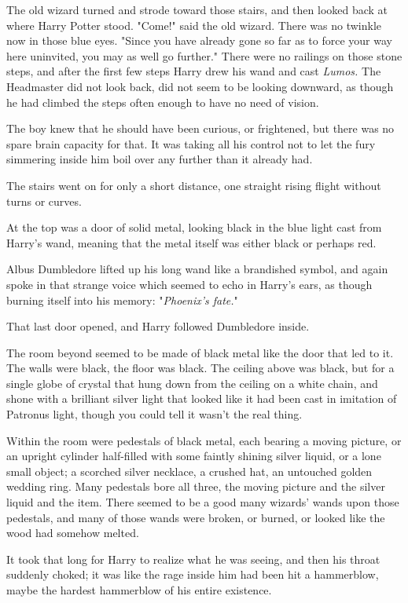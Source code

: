 The old wizard turned and strode toward those stairs, and then looked back at 
where Harry Potter stood. "Come!" said the old wizard. There was no twinkle now 
in those blue eyes. "Since you have already gone so far as to force your way 
here uninvited, you may as well go further."
\sbreak
There were no railings on those stone steps, and after the first few steps 
Harry drew his wand and cast \emph{Lumos.} The Headmaster did not look back, 
did not seem to be looking downward, as though he had climbed the steps often 
enough to have no need of vision.

The boy knew that he should have been curious, or frightened, but there was no 
spare brain capacity for that. It was taking all his control not to let the 
fury simmering inside him boil over any further than it already had.

The stairs went on for only a short distance, one straight rising flight 
without turns or curves.

At the top was a door of solid metal, looking black in the blue light cast from 
Harry's wand, meaning that the metal itself was either black or perhaps red.

Albus Dumbledore lifted up his long wand like a brandished symbol, and again 
spoke in that strange voice which seemed to echo in Harry's ears, as though 
burning itself into his memory: "\emph{Phoenix's fate.}"

That last door opened, and Harry followed Dumbledore inside.

The room beyond seemed to be made of black metal like the door that led to it. 
The walls were black, the floor was black. The ceiling above was black, but for 
a single globe of crystal that hung down from the ceiling on a white chain, and 
shone with a brilliant silver light that looked like it had been cast in 
imitation of Patronus light, though you could tell it wasn't the real thing.

Within the room were pedestals of black metal, each bearing a moving picture, 
or an upright cylinder half-filled with some faintly shining silver liquid, or 
a lone small object; a scorched silver necklace, a crushed hat, an untouched 
golden wedding ring. Many pedestals bore all three, the moving picture and the 
silver liquid and the item. There seemed to be a good many wizards' wands upon 
those pedestals, and many of those wands were broken, or burned, or looked like 
the wood had somehow melted.

It took that long for Harry to realize what he was seeing, and then his throat 
suddenly choked; it was like the rage inside him had been hit a hammerblow, 
maybe the hardest hammerblow of his entire existence.

